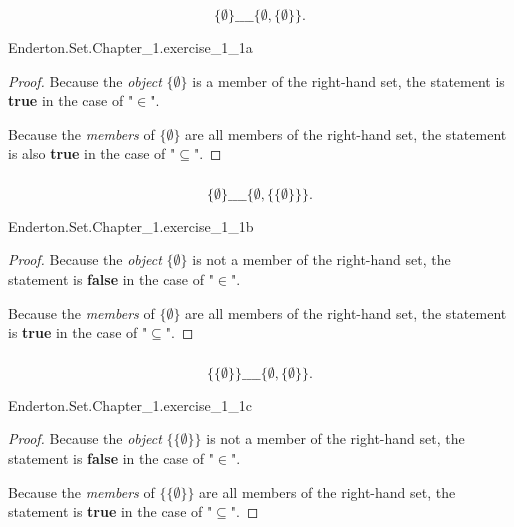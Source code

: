 \documentclass{report}
\begin{document}
  $$\{\emptyset\} \_\_\_\_ \{\emptyset, \{\emptyset\}\}.$$

    {Enderton.Set.Chapter\_1.exercise\_1\_1a}

  \begin{proof}
    Because the \textit{object} $\{\emptyset\}$ is a member of the right-hand
      set, the statement is \textbf{true} in the case of "$\in$".

    Because the \textit{members} of $\{\emptyset\}$ are all members of the
      right-hand set, the statement is also \textbf{true} in the case of
      "$\subseteq$".
  \end{proof}

\subsubsection{}%

  $$\{\emptyset\} \_\_\_\_ \{\emptyset, \{\{\emptyset\}\}\}.$$

    {Enderton.Set.Chapter\_1.exercise\_1\_1b}

  \begin{proof}
    Because the \textit{object} $\{\emptyset\}$ is not a member of the
      right-hand set, the statement is \textbf{false} in the case of "$\in$".

    Because the \textit{members} of $\{\emptyset\}$ are all members of the
      right-hand set, the statement is \textbf{true} in the case of
      "$\subseteq$".
  \end{proof}

\subsubsection{}%

  $$\{\{\emptyset\}\} \_\_\_\_ \{\emptyset, \{\emptyset\}\}.$$

    {Enderton.Set.Chapter\_1.exercise\_1\_1c}

  \begin{proof}
    Because the \textit{object} $\{\{\emptyset\}\}$ is not a member of the
      right-hand set, the statement is \textbf{false} in the case of "$\in$".

    Because the \textit{members} of $\{\{\emptyset\}\}$ are all members of the
      right-hand set, the statement is \textbf{true} in the case of
      "$\subseteq$".
  \end{proof}
\end{document}
